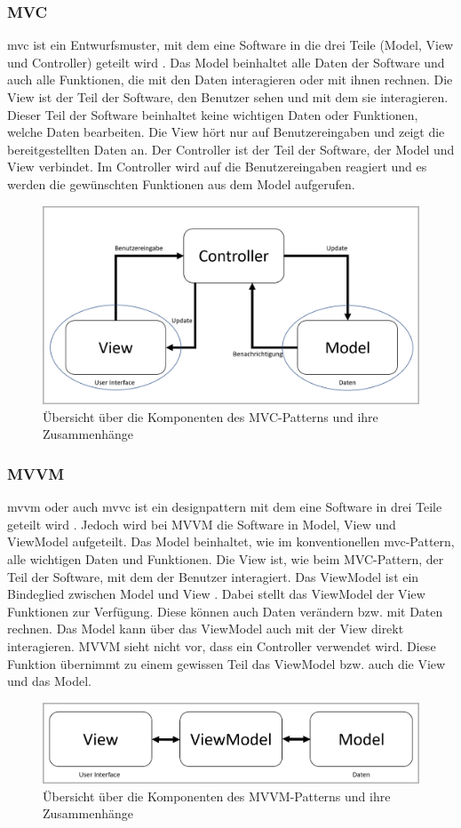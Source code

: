 \subsubsection{MVC}
\Gls{mvc} ist ein Entwurfsmuster, mit dem eine Software in die drei Teile (Model, View und Controller) geteilt wird \cite{mvc}. Das Model beinhaltet alle Daten der Software und auch alle Funktionen, die mit den Daten interagieren oder mit ihnen rechnen. Die View ist der Teil der Software, den Benutzer sehen und mit dem sie interagieren. Dieser Teil der Software beinhaltet keine wichtigen Daten oder Funktionen, welche Daten bearbeiten. Die View hört nur auf Benutzereingaben und zeigt die bereitgestellten Daten an. Der Controller ist der Teil der Software, der Model und View verbindet. Im Controller wird auf die Benutzereingaben reagiert und es werden die gewünschten Funktionen aus dem Model aufgerufen.
\begin{figure}[H]
	\centering
	\includegraphics[width=0.75\linewidth]{images/rfoster_study/mvc}
	\caption[Übersicht des MVC-Patterns]{Übersicht über die Komponenten des MVC-Patterns und ihre Zusammenhänge}
	\label{fig:mvc}
\end{figure}
\subsubsection{MVVM}
\Gls{mvvm} oder auch \Gls{mvvc} ist ein \Gls{designpattern} mit dem eine Software in drei Teile geteilt wird \cite{mvvm_vue}. Jedoch wird bei MVVM die Software in Model, View und ViewModel aufgeteilt. 
Das Model beinhaltet, wie im konventionellen \Gls{mvc}-Pattern, alle wichtigen Daten und Funktionen. 
Die View ist, wie beim MVC-Pattern, der Teil der Software, mit dem der Benutzer interagiert. 
Das ViewModel ist ein Bindeglied zwischen Model und View \cite{mvvm_vue}. Dabei stellt das ViewModel der View Funktionen zur Verfügung. Diese können auch Daten verändern bzw. mit Daten rechnen. Das Model kann über das ViewModel auch mit der View direkt interagieren. 
MVVM sieht nicht vor, dass ein Controller verwendet wird. Diese Funktion übernimmt zu einem gewissen Teil das ViewModel bzw. auch die View und das Model.
\begin{figure}[H]
	\centering
	\includegraphics[width=0.8\linewidth]{images/rfoster_study/mvvm}
	\caption[Übersicht des MVVM-Patterns]{Übersicht über die Komponenten des MVVM-Patterns und ihre Zusammenhänge}
	\label{fig:mvvm}
\end{figure}
